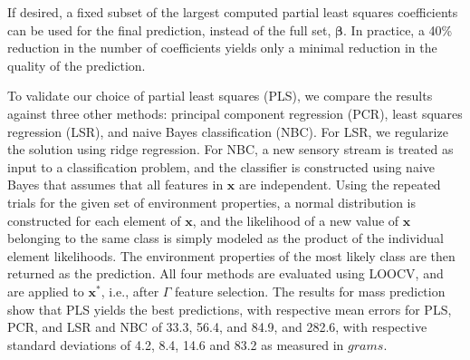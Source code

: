 
If desired, a fixed subset of the largest computed partial least squares coefficients can be used for the final prediction, instead of the full set, $\mathbf{\beta}$. 
In practice, a 40\% reduction in the number of coefficients yields only a minimal reduction in the quality of the prediction.

% 


To validate our choice of partial least squares (PLS), we compare the results against three other methods:  principal component regression (PCR), least squares regression (LSR), and naive Bayes classification (NBC).
For LSR, we regularize the solution using ridge regression.
For NBC, a new sensory stream is treated as input to a classification problem, and the classifier is constructed using naive Bayes that assumes that all features in $\mathbf{x}$ are independent.
Using the repeated trials for the given set of environment properties, a normal distribution is constructed for each element of $\mathbf{x}$, and the likelihood of a new value of $\mathbf{x}$ belonging to the same class is simply modeled as the product of the individual element likelihoods.
The environment properties of the most likely class are then returned as the prediction.
All four methods are evaluated using LOOCV, and are applied to $\mathbf{x^*}$, i.e., after $\Gamma$ feature selection.
The results for mass prediction show that PLS yields the best predictions, with respective mean errors for PLS, PCR, and LSR and NBC of 33.3, 56.4, and 84.9, and 282.6, 
with respective standard deviations of 4.2, 8.4, 14.6 and 83.2 as measured in $grams$.

